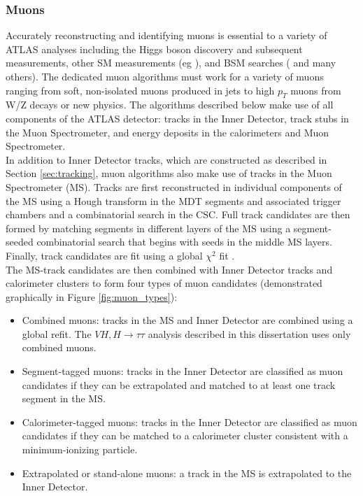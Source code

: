 \subsubsection{Muons}\label{sec:muons}
Accurately reconstructing and identifying muons is essential to a variety of ATLAS analyses including the Higgs boson discovery \cite{higgs_paper} and subsequent measurements, other SM measurements (eg \cite{zz_paper}), and BSM searches (\cite{muon_bsm} and many others). The dedicated muon algorithms must work for a variety of muons ranging from soft, non-isolated muons produced in jets to high $p_T$ muons from W/Z decays or new physics. The algorithms described below make use of all components of the ATLAS detector: tracks in the Inner Detector, track stubs in the Muon Spectrometer, and energy deposits in the calorimeters and Muon Spectrometer.\\

In addition to Inner Detector tracks, which are constructed as described in Section \ref{sec:tracking}, muon algorithms also make use of tracks in the Muon Spectrometer (MS). Tracks are first reconstructed in individual components of the MS using a Hough transform in the MDT segments and associated trigger chambers and a combinatorial search in the CSC. Full track candidates are then formed by matching segments in different layers of the MS using a segment-seeded combinatorial search that begins with seeds in the middle MS layers. Finally, track candidates are fit using a global $\chi^2$ fit \cite{muons_run2}.\\

The MS-track candidates are then combined with Inner Detector tracks and calorimeter clusters to form four types of muon candidates (demonstrated graphically in Figure \ref{fig:muon_types}):
\begin{itemize}
    \item Combined muons: tracks in the MS and Inner Detector are combined using a global refit. The $VH,H\rightarrow \tau\tau$ analysis described in this dissertation uses only combined muons.
    \item Segment-tagged muons: tracks in the Inner Detector are classified as muon candidates if they can be extrapolated and matched to at least one track segment in the MS.
    \item Calorimeter-tagged muons: tracks in the Inner Detector are classified as muon candidates if they can be matched to a calorimeter cluster consistent with a minimum-ionizing particle.
    \item Extrapolated or stand-alone muons: a track in the MS is extrapolated to the Inner Detector.
\end{itemize}

